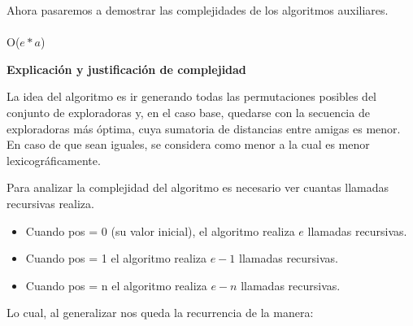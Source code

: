 \documentclass[11pt]{article}
\begin{document}
Ahora pasaremos a demostrar las complejidades de los algoritmos auxiliares.
\\ \\
\noindent\makebox[\linewidth]{\rule{17cm}{0.4pt}}
 {O($e*a$)}

\vspace{3mm}
\begin{center}
\textbf{Explicación y justificación de complejidad} \\ 
\end{center} 

La idea del algoritmo es ir generando todas las permutaciones posibles del conjunto de exploradoras y, en el 
caso base, quedarse con la secuencia de exploradoras más óptima, cuya sumatoria de distancias entre 
amigas es menor. En caso de que sean iguales, se considera como menor a la cual es menor lexicográficamente. 

Para analizar la complejidad del algoritmo es necesario ver cuantas llamadas recursivas realiza.
\begin{itemize}
\item Cuando pos = 0 (su valor inicial), el algoritmo realiza $e$ llamadas recursivas.
\item Cuando pos = 1 el algoritmo realiza $e-1$ llamadas recursivas.
\item Cuando pos = n el algoritmo realiza $e-n$ llamadas recursivas.
\end{itemize}

Lo cual, al generalizar nos queda la recurrencia de la manera:
\end{document}
